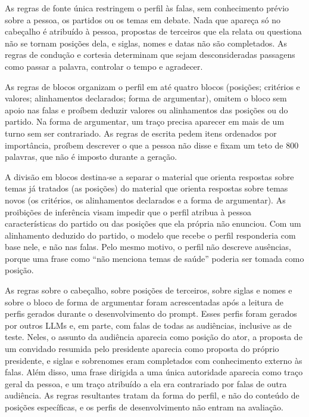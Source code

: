 As regras de fonte única restringem o perfil às falas, sem conhecimento prévio sobre a pessoa, os
partidos ou os temas em debate. Nada que apareça só no cabeçalho é atribuído à pessoa, propostas de
terceiros que ela relata ou questiona não se tornam posições dela, e siglas, nomes e datas não são
completados. As regras de condução e cortesia determinam que sejam desconsideradas passagens como
passar a palavra, controlar o tempo e agradecer.

As regras de blocos organizam o perfil em até quatro blocos (posições; critérios e valores;
alinhamentos declarados; forma de argumentar), omitem o bloco sem apoio nas falas e proíbem deduzir
valores ou alinhamentos das posições ou do partido. Na forma de argumentar, um traço precisa aparecer
em mais de um turno sem ser contrariado. As regras de escrita pedem itens ordenados por importância,
proíbem descrever o que a pessoa não disse e fixam um teto de 800 palavras, que não é imposto durante
a geração.

A divisão em blocos destina-se a separar o material que orienta respostas sobre temas já tratados
(as posições) do material que orienta respostas sobre temas novos (os critérios, os alinhamentos
declarados e a forma de argumentar). As proibições de inferência visam impedir que o perfil atribua à
pessoa características do partido ou das posições que ela própria não enunciou. Com um alinhamento
deduzido do partido, o modelo que recebe o perfil responderia com base nele, e não nas falas. Pelo
mesmo motivo, o perfil não descreve ausências, porque uma frase como ``não menciona temas de saúde''
poderia ser tomada como posição.

As regras sobre o cabeçalho, sobre posições de terceiros, sobre siglas e nomes e sobre o bloco de
forma de argumentar foram acrescentadas após a leitura de perfis gerados durante o desenvolvimento do
prompt. Esses perfis foram gerados por outros LLMs e, em parte, com falas de todas as audiências,
inclusive as de teste. Neles, o assunto da audiência aparecia como posição do ator, a proposta de um
convidado resumida pelo presidente aparecia como proposta do próprio presidente, e siglas e sobrenomes
eram completados com conhecimento externo às falas. Além disso, uma frase dirigida a uma única
autoridade aparecia como traço geral da pessoa, e um traço atribuído a ela era contrariado por falas
de outra audiência. As regras resultantes tratam da forma do perfil, e não do conteúdo de posições
específicas, e os perfis de desenvolvimento não entram na avaliação.


